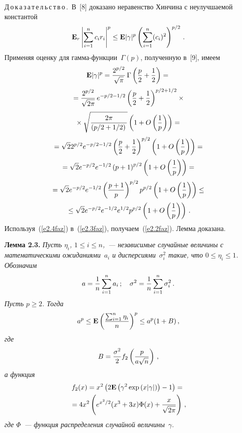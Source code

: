 \begin{multicols}{2}
\noindent
Д\,о\,к\,а\,з\,а\,т\,е\,л\,ь\,с\,т\,в\,о\,.\ В~[8] доказано неравенство Хинчина с
неулучшаемой константой
\begin{equation}
{\E_r}\left|\sum\limits_{i=1}^n c_ir_i\right|^p \le {\mathbf
E}|\gamma|^p\left(\sum\limits_{i=1}^n(c_i)^2\right)^{p/2}\,.
\label{e2.3faz}
\end{equation}
Применяя оценку для гамма-функции~$\Gamma(p)$, полученную в~[9],
имеем
\begin{multline}
 {\mathbf
E}|\gamma|^p=\fr{2^{p/2}}{\sqrt{\pi}}\,\Gamma\left(\fr{p}{2}+\fr{1}{2}\right)={}\\[2pt]
{}=
\fr{2^{p/2}}{\sqrt{2\pi}}\,e^{-p/2-1/2}\left(\fr{p}{2}+\fr{1}{2}\right)^{p/2+1/2}\times{}\\[2pt]
{}\times
\sqrt{\fr{2\pi}{\left(p/2+1/2\right)}}\left(1+O\left(\fr{1}{p}\right)\right)={}\\[2pt]
{}=
\sqrt{2}2^{p/2}e^{-p/2-1/2}\left(\fr{p}{2}+\fr{1}{2}\right)^{p/2}
\left(1+O\left(\fr{1}{p}\right)\right)={}\\[2pt]
{}=\sqrt{2}e^{-p/2}e^{-1/2}\left(p+1\right)^{{p}/{2}}
\left(1+O\left(\fr{1}{p}\right)\right)={}\\[2pt]
{}=
\sqrt{2}e^{-p/2}e^{-1/2}\left(\fr{p+1}{p}\right)^{p/2}p^{p/2}
\left(1+O\left(\fr{1}{p}\right)\right)\le{}\\[2pt]
{}\le
\sqrt{2}e^{-{p}/{2}}e^{-{1}/{2}}e^{{1}/{2}}p^{p/2}
\left(1+O\left(\fr{1}{p}\right)\right)\,.
\label{e2.4faz}
\end{multline}
Используя~(\ref{e2.4faz}) в~(\ref{e2.3faz}), получаем~(\ref{e2.2faz}). Лемма доказана.

\medskip

\noindent

\textbf{Лемма 2.3.} {\it  Пусть $\eta_i$, $1\le i\le n$,~---
независимые случайные величины с математическими ожиданиями~$a_i$ и
дисперсиями~$\sigma_i^2$ такие, что $0\le\eta_i\le 1$. Обозначим
$$
a=\displaystyle\frac{\displaystyle 1\mathstrut}{\displaystyle n\mathstrut} \sum_{i=1}^na_i\,;\quad \sigma^2=\displaystyle\frac{\displaystyle 1\mathstrut}{\displaystyle n\mathstrut}\sum_{i=1}^n\sigma^2_i\,.
$$
Пусть $p\ge 2$. Тогда
\begin{equation}
a^p\le {\E}\left(\frac{ \sum_{i=1}^n\eta_i}{n}\right)^p\le a^p(1+B)\,,
\label{e2.5faz}
\end{equation}
где
$$
B= \displaystyle\frac{\displaystyle \sigma^2\mathstrut}{\displaystyle 2\mathstrut}f_2\left(\displaystyle\frac{\displaystyle p\mathstrut}{\displaystyle a\sqrt{n}\mathstrut}\right)\,,
$$
а функция
\begin{multline*}
f_2(x)=x^2\left(2{\mathbf
E}\left(\gamma^2\exp{(x|\gamma|)}\right)-1\right)={}\\
{}=
4x^2\left(e^{x^2/2}(x^3+3x)\Phi(x)+\displaystyle\frac{\displaystyle x\mathstrut}{\displaystyle \sqrt{2\pi}\mathstrut}\right)\,,
\end{multline*}
где $\Phi$~--- функция распределения случайной величины~$\gamma$.
}


\end{multicols}
